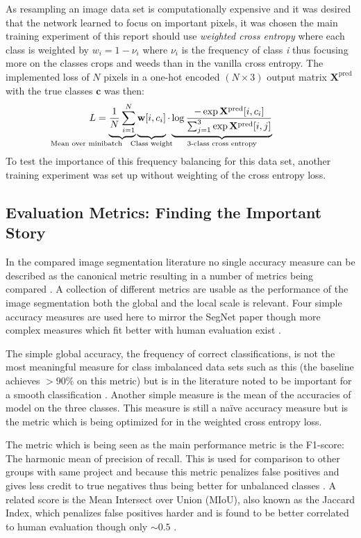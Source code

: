 \documentclass{article}
\begin{document}
As resampling an image data set is computationally expensive and it was desired that the network learned to focus on important pixels, it was chosen the main training experiment of this report should use \textit{weighted cross entropy} where each class is weighted by \(w_i = 1-\nu_i\) where \(\nu_i\) is the frequency of class \textit{i} thus focusing more on the classes crops and weeds than in the vanilla cross entropy. The implemented loss of \(N\) pixels in a one-hot encoded \((N \times  3)\) output matrix \(\mathbf X^\text{pred}\) with the true classes \(\mathbf c\) was then:
\[
L = \underbrace{
	\vphantom{\sum_{i}}
	\frac 1 N
	\sum_{\mathclap {i=1}}^{N}
}
_{\mathllap{\text{Mean over minibatch}}}
\underbrace{ 
	\vphantom{\sum_{i}}
	\mathbf{w}[i, c_i]}
_{\mathclap{\text{Class weight}}}  
\cdot 
\underbrace{
	\log 
	\frac
	{-\exp\mathbf X^\text{pred}[i, c_i]}
	{\sum_{j=1}^{3}\exp\mathbf X^\text{pred}[i, j]}
}_{\mathclap{\text{3-class cross entropy}}}
\] 
To test the importance of this frequency balancing for this data set, another training experiment was set up without weighting of the cross entropy loss.
\subsection{Evaluation Metrics: Finding the Important Story}
In the compared image segmentation literature no single accuracy measure can be described  as the canonical metric resulting in a number of metrics being compared \cite{eval, Metric}.  A collection of different metrics are usable as the performance of the image segmentation both the global and the local scale is relevant. 
Four simple accuracy measures are used here to mirror the SegNet paper \cite{seg} though more complex measures which fit better with human evaluation exist \cite{eval}. 

The simple global accuracy, the frequency of correct classifications, is not the most meaningful measure for class imbalanced data sets such as this (the baseline achieves \(>90\%\) on this metric) but is in the literature noted to be important for a smooth classification \cite{seg}. Another simple measure is the mean of the accuracies of model on the three classes. This measure is still a naïve accuracy measure but is the metric which is being optimized for in the weighted cross entropy loss. 

The metric which is being seen as the main performance metric is the F1-score: The harmonic mean of precision of recall. This is used for comparison to other groups with same project and because this metric penalizes false positives and gives less credit to true negatives thus being better for unbalanced classes \cite{Metric}. A related score is the Mean Intersect over Union (MIoU), also known as the Jaccard Index, which penalizes false positives harder and is found to be better correlated to human evaluation though only \(\sim 0.5\) \cite{eval}. 
\end{document}
